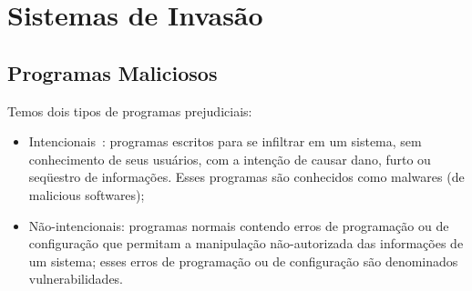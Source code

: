 \chapter{Sistemas de Invasão}


\section{Programas Maliciosos}
Temos dois tipos de programas prejudiciais:
\begin{itemize}
\item Intencionais~\cite{jamhour}: programas escritos para se infiltrar em um sistema, sem conhecimento de seus usuários, com a intenção de causar dano, furto ou seqüestro de informações. Esses programas são conhecidos como malwares (de
malicious softwares);
\item Não-intencionais: programas normais contendo erros de programação ou de configuração que permitam a manipulação não-autorizada das informações de um sistema; esses erros de programação ou de configuração são  denominados vulnerabilidades.
\end{itemize}

